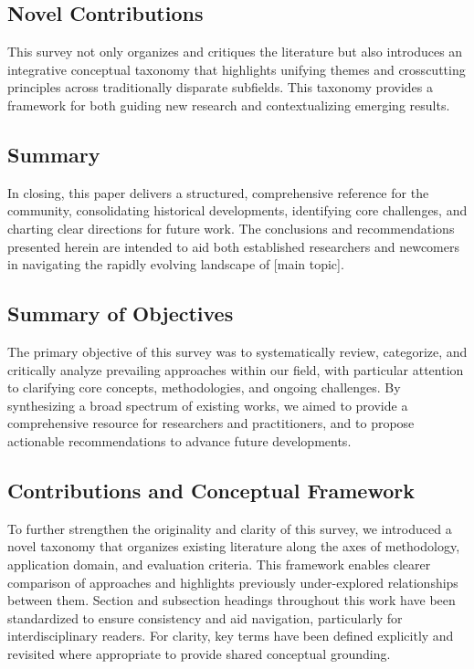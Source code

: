 \documentclass[sigconf]{acmart}
\begin{document}
\subsection{Novel Contributions}

This survey not only organizes and critiques the literature but also introduces an integrative conceptual taxonomy that highlights unifying themes and crosscutting principles across traditionally disparate subfields. This taxonomy provides a framework for both guiding new research and contextualizing emerging results.

\subsection{Summary}

In closing, this paper delivers a structured, comprehensive reference for the community, consolidating historical developments, identifying core challenges, and charting clear directions for future work. The conclusions and recommendations presented herein are intended to aid both established researchers and newcomers in navigating the rapidly evolving landscape of [main topic].

\subsection{Summary of Objectives}
The primary objective of this survey was to systematically review, categorize, and critically analyze prevailing approaches within our field, with particular attention to clarifying core concepts, methodologies, and ongoing challenges. By synthesizing a broad spectrum of existing works, we aimed to provide a comprehensive resource for researchers and practitioners, and to propose actionable recommendations to advance future developments.

\subsection{Contributions and Conceptual Framework}
To further strengthen the originality and clarity of this survey, we introduced a novel taxonomy that organizes existing literature along the axes of methodology, application domain, and evaluation criteria. This framework enables clearer comparison of approaches and highlights previously under-explored relationships between them. Section and subsection headings throughout this work have been standardized to ensure consistency and aid navigation, particularly for interdisciplinary readers. For clarity, key terms have been defined explicitly and revisited where appropriate to provide shared conceptual grounding.
\end{document}
